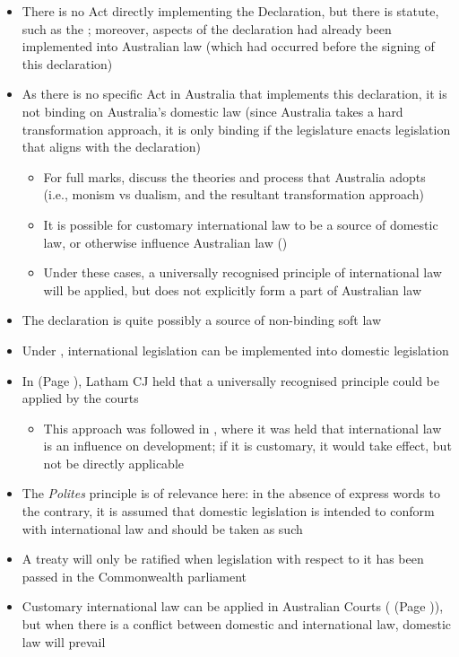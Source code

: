 \begin{itemize}
    \item There is no Act directly implementing the Declaration, but there is statute, such as the ; moreover, aspects of the declaration had already been implemented into Australian law (which had occurred before the signing of this declaration)
    \item As there is no specific Act in Australia that implements this declaration, it is not binding on Australia's domestic law (since Australia takes a hard transformation approach, it is only binding if the legislature enacts legislation that aligns with the declaration)
    \begin{itemize}
        \item For full marks, discuss the theories and process that Australia adopts (i.e., monism vs dualism, and the resultant transformation approach)
        \item It is possible for customary international law to be a source of domestic law, or otherwise influence Australian law ()
        \item Under these cases, a universally recognised principle of international law will be applied, but does not explicitly form a part of Australian law
    \end{itemize}
    \item The declaration is quite possibly a source of non-binding soft law
    \item Under , international legislation can be implemented into domestic legislation
    \item In  (Page \pageref{case:Chow Hung Ching}), Latham CJ held that a universally recognised principle could be applied by the courts
    \begin{itemize}
        \item This approach was followed in , where it was held that international law is an influence on development; if it is customary, it would take effect, but not be directly applicable
    \end{itemize}
    \item The \textit{Polites} principle is of relevance here: in the absence of express words to the contrary, it is assumed that domestic legislation is intended to conform with international law and should be taken as such
    \item A treaty will only be ratified when legislation with respect to it has been passed in the Commonwealth parliament
    \item Customary international law can be applied in Australian Courts ( (Page \pageref{case:Chow Hung Ching})), but when there is a conflict between domestic and international law, domestic law will prevail
\end{itemize}

